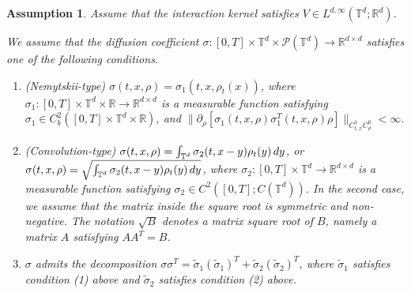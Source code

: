 \documentclass[10pt,a4paper]{amsart}
\numberwithin{equation}{section}
\newtheorem{assumption}[theorem]{Assumption}
\def\dif{{\mathord{{\rm d}}}}
\def\dif{{\mathord{{\rm d}}}}
\begin{document}
\begin{assumption}
\label{def:ass}
Assume that the interaction kernel satisfies
$V\in L^{d,\infty}(\mathbb{T}^d;\mathbb{R}^d)$.

We assume that the diffusion coefficient
$\sigma:[0,T]\times\mathbb{T}^d\times\mathcal P(\mathbb{T}^d)
\to\mathbb{R}^{d\times d}$ satisfies one of the following conditions.

\begin{enumerate}

\item[(1)] (Nemytskii-type)
$\sigma(t,x,\rho)=\sigma_1(t,x,\rho_t(x))$,
where
$\sigma_1:[0,T]\times\mathbb{T}^d\times  \mathbb{R}\to \mathbb{R}^{d\times d}$
is a measurable function satisfying
$\sigma_1\in C_b^2([0,T]\times  \mathbb{T}^d\times \mathbb{R})$, and $\|\partial_\rho[\sigma_1(t,x,\rho)\sigma_1^T(t,x,\rho)\rho]\|_{C_{t,x}^1C_\rho^0}<\infty$.

\item[(2)] (Convolution-type)
$\sigma(t,x,\rho)=\int_{\mathbb{T}^d}\sigma_2(t,x-y)\rho_t(y)\,\dif y$, or $\sigma(t,x,\rho)=\sqrt{\int_{\mathbb{T}^d}\sigma_2(t,x-y)\rho_t(y)\,\dif y}$,
where
$\sigma_2:[0,T]\times \mathbb{T}^d\to \mathbb{R}^{d\times d}$
is a measurable function satisfying
$\sigma_2\in C^2([0,T];C( \mathbb{T}^d))$.  In the second case, we assume that the matrix inside the square root is
symmetric and non-negative. The notation $\sqrt{B}$ denotes a matrix square
root of $B$, namely a matrix $A$ satisfying $AA^T=B$.
 

\item[(3)] $\sigma$ admits the decomposition
$\sigma\sigma^T
=
\tilde{\sigma}_1(\tilde{\sigma}_1)^T
+
\tilde{\sigma}_2(\tilde{\sigma}_2)^T$,
where $\tilde{\sigma}_1$ satisfies condition \textnormal{(1)} above and $\tilde{\sigma}_2$ satisfies condition \textnormal{(2)} above.

\end{enumerate}
\end{assumption}
\end{document}
